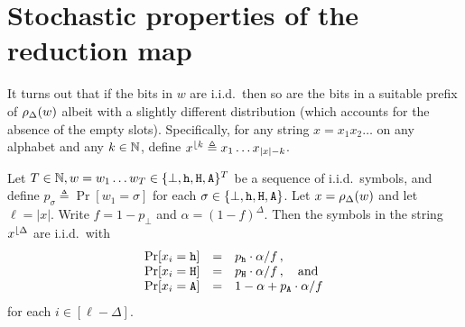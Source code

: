 \section{Stochastic properties of the reduction map}
It turns out that 
if the bits in $w$ are i.i.d.\ then 
so are the bits in a suitable prefix of $\rho_\Delta(w)$ 
albeit with a slightly different distribution 
(which accounts for the absence of the empty slots). 
Specifically, for any string $x = x_1 x_2 \ldots $ on any alphabet and any $k \in \mathbb{N}$, 
define $x^{\lfloor {k}} \triangleq x_1 \ldots x_{|x| - k}$.

\begin{proposition}\label{prop:reduction-indep}
  Let $T \in \mathbb{N}, w = w_1 \ldots w_T \in \{\perp, \mathtt{h}, \mathtt{H}, \mathtt{A}\}^T$ 
  be a sequence of i.i.d.\ symbols, 
  and define $p_\sigma \triangleq \Pr[w_1 = \sigma]$ for each $\sigma \in \{\perp, \mathtt{h}, \mathtt{H}, \mathtt{A}\}$.
  Let $x = \rho_\Delta(w)$ and let $\ell = |x|$. 
  Write $f = 1 - p_\perp$ and $\alpha = (1 - f)^\Delta$. 
  Then the symbols in the string $x^{\lfloor {\Delta}}$ are i.i.d.\ 
  with 
  \begin{align}\label{eq:reduction-dist}
    \begin{matrix*}[l]
      \Pr[x_i = \h] &=& p_\h \cdot \alpha / f\,, \\
      \Pr[x_i = \H] &=& p_\H \cdot \alpha / f\,, \quad \text{and}\\
      \Pr[x_i = \A] &=& 1 - \alpha + p_\A \cdot \alpha / f\,
    \end{matrix*}
  \end{align}
  for each $i \in [\ell - \Delta]$.
\end{proposition}
